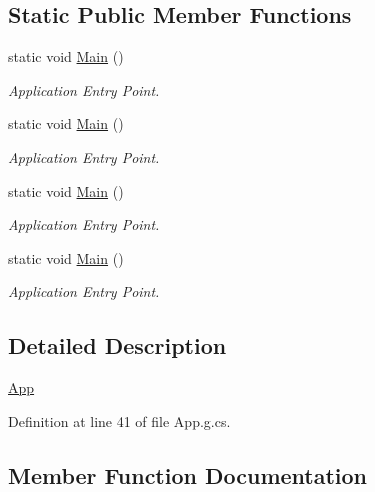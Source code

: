 \subsection*{Static Public Member Functions}
\begin{DoxyCompactItemize}
\item 
static void \hyperlink{class_reversi_wpf_1_1_app_a21f38c0f40a47a04302edeeb7bf005f8}{Main} ()
\begin{DoxyCompactList}\small\item\em Application Entry Point. \end{DoxyCompactList}\item 
static void \hyperlink{class_reversi_wpf_1_1_app_a21f38c0f40a47a04302edeeb7bf005f8}{Main} ()
\begin{DoxyCompactList}\small\item\em Application Entry Point. \end{DoxyCompactList}\item 
static void \hyperlink{class_reversi_wpf_1_1_app_a21f38c0f40a47a04302edeeb7bf005f8}{Main} ()
\begin{DoxyCompactList}\small\item\em Application Entry Point. \end{DoxyCompactList}\item 
static void \hyperlink{class_reversi_wpf_1_1_app_a21f38c0f40a47a04302edeeb7bf005f8}{Main} ()
\begin{DoxyCompactList}\small\item\em Application Entry Point. \end{DoxyCompactList}\end{DoxyCompactItemize}


\subsection{Detailed Description}
\hyperlink{class_reversi_wpf_1_1_app}{App} 



Definition at line 41 of file App.\+g.\+cs.



\subsection{Member Function Documentation}
